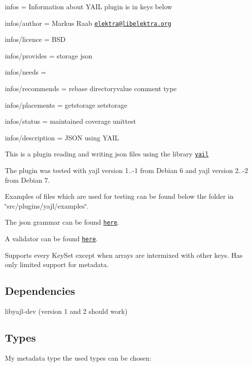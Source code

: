 
\begin{DoxyItemize}
\item infos = Information about Y\+A\+I\+L plugin is in keys below
\item infos/author = Markus Raab \href{mailto:elektra@libelektra.org}{\tt elektra@libelektra.\+org}
\item infos/licence = B\+S\+D
\item infos/provides = storage json
\item infos/needs =
\item infos/recommends = rebase directoryvalue comment type
\item infos/placements = getstorage setstorage
\item infos/status = maintained coverage unittest
\item infos/description = J\+S\+O\+N using Y\+A\+I\+L
\end{DoxyItemize}

This is a plugin reading and writing json files using the library \href{http://lloyd.github.com/yajl/}{\tt yail}

The plugin was tested with yajl version 1..-\/1 from Debian 6 and yajl version 2..-\/2 from Debian 7.

Examples of files which are used for testing can be found below the folder in \char`\"{}src/plugins/yajl/examples\char`\"{}.

The json grammar can be found \href{http://www.ietf.org/rfc/rfc4627.txt}{\tt here}.

A validator can be found \href{http://jsonlint.com/}{\tt here}.

Supports every Key\+Set except when arrays are intermixed with other keys. Has only limited support for metadata.

\subsection*{Dependencies}


\begin{DoxyItemize}
\item {\ttfamily libyajl-\/dev} (version 1 and 2 should work)
\end{DoxyItemize}

\subsection*{Types}

My metadata {\ttfamily type} the used types can be chosen\+:



